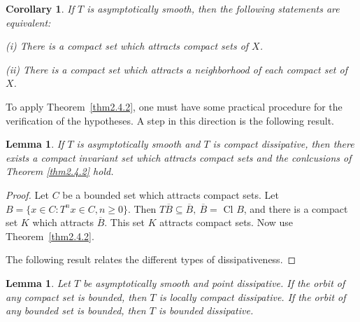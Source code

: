 \documentclass{surv-l}
\theoremstyle{plain}
\newtheorem{corollary}[theorem]{Corollary}
\newtheorem{lemma}[theorem]{Lemma}
\theoremstyle{definition}
\numberwithin{equation}{section}
\numberwithin{figure}{chapter}
\begin{document}
\begin{corollary}\label{cor2.4.3} If $T$ is asymptotically smooth, then the following statements are equivalent:

\emph{(i)} There is a compact set which attracts compact sets of $X$.

\emph{(ii)} There is a compact set which attracts a neighborhood of each compact set of $X$.
\end{corollary}

To apply Theorem~\ref{thm2.4.2}, one must have some practical procedure for the verification of the hypotheses. A step in this direction is the following result.

\begin{lemma}\label{lem2.4.4} If $T$ is asymptotically smooth and $T$ is compact dissipative,
then there exists a compact invariant set which attracts compact sets and the conlcusions of Theorem \emph{\ref{thm2.4.2}} hold.
\end{lemma}

\begin{proof}
Let $C$ be a bounded set which attracts compact sets. Let $B= \{x\in C\!:T^{n}x\in C, n\geq 0\}$. Then $T\overline{B}\subseteq\overline{B},\ \overline{B}=$ Cl $B$, and there is a compact set $K$ which attracts $\overline{B}$. This set $K$ attracts compact sets. Now use Theorem~\ref{thm2.4.2}.

The following result relates the different types of dissipativeness.
\end{proof}

\begin{lemma}\label{lem2.4.5} Let $T$ be asymptotically smooth and point dissipative. If the
orbit of any compact set is bounded, then $T$ is locally compact dissipative. If the orbit of any bounded set is bounded, then $T$ is bounded dissipative.
\end{lemma}
\end{document}
